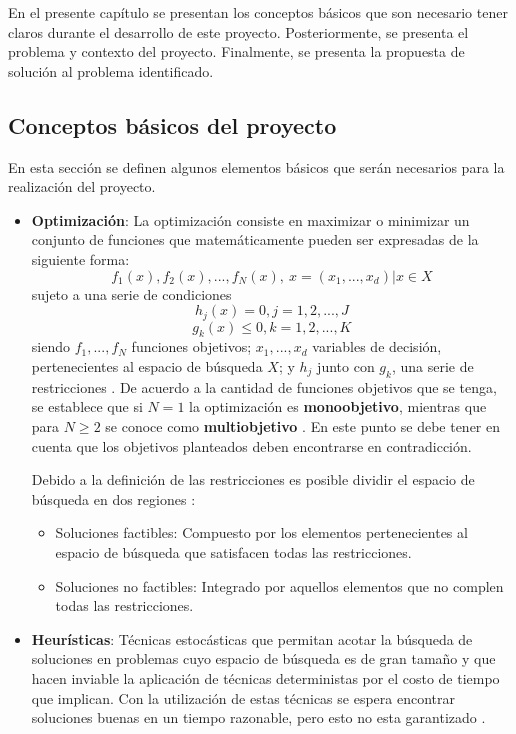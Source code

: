 \documentclass[11pt,letterpaper]{article}
\begin{document}
En el presente capítulo se presentan los conceptos básicos que son necesario tener claros durante el desarrollo de este proyecto. Posteriormente, se presenta el problema y contexto del proyecto. Finalmente, se presenta la propuesta de solución al problema identificado.
\subsection{Conceptos básicos del proyecto} 

En esta sección se definen algunos elementos básicos que serán necesarios para la realización del proyecto.

\begin{itemize}
\item \textbf{Optimización}: La optimización consiste en maximizar o minimizar un conjunto de funciones que matemáticamente pueden ser expresadas de la siguiente forma:
$$f_1(x),f_2(x), ..., f_N(x),\ x=(x_1,...,x_d) | x \in X$$
sujeto a una serie de condiciones
$$h_j(x) = 0, j=1,2,...,J$$
$$g_k(x) \leq 0, k=1,2,...,K$$
siendo $f_1,...,f_N$ funciones objetivos; $x_1, ..., x_d$ variables de decisión, pertenecientes al espacio de búsqueda $X$; y $h_j$ junto con $g_k$, una serie de restricciones \cite{Yang2015}. De acuerdo a la cantidad de funciones objetivos que se tenga, se establece que si $N=1$ la optimización es \textbf{monoobjetivo}, mientras que para $N\geq 2$ se conoce como \textbf{multiobjetivo} \cite{Yang2015}. En este punto se debe tener en cuenta que los objetivos planteados deben encontrarse en contradicción. 

Debido a la definición de las restricciones es posible dividir el espacio de búsqueda en dos regiones \cite{Bozorg-Haddad2017}:
\begin{itemize}
	\item Soluciones factibles: Compuesto por los elementos pertenecientes al espacio de búsqueda que satisfacen todas las restricciones.
	\item Soluciones no factibles: Integrado por aquellos elementos que no complen todas las restricciones.
\end{itemize}


\item \textbf{Heurísticas}: Técnicas estocásticas que permitan acotar la búsqueda de soluciones en problemas cuyo espacio de búsqueda es de gran tamaño y que hacen inviable la aplicación de técnicas deterministas por el costo de tiempo que implican. Con la utilización de estas técnicas se espera encontrar soluciones buenas en un tiempo razonable, pero esto no esta garantizado \cite{Yang2015,Romanycia1985}.



\end{itemize}
\end{document}
